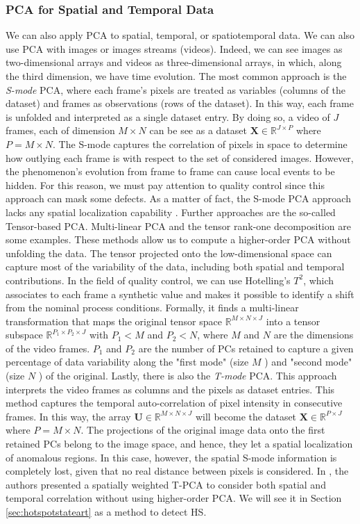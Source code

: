 \subsubsection{PCA for Spatial and Temporal Data}
We can also apply PCA to spatial, temporal, or spatiotemporal data. We can also use PCA with images or images streams (videos). Indeed, we can see images as two-dimensional arrays and videos as three-dimensional arrays, in which, along the third dimension, we have time evolution. The most common approach is the \emph{S-mode} PCA, where each frame's pixels are treated as variables (columns of the dataset) and frames as observations (rows of the dataset). In this way, each frame is unfolded and interpreted as a single dataset entry. By doing so, a video of $J$ frames, each of dimension $M\times N$ can be see as a dataset $\mathbf{X}\in\mathbb{R}^{J\times P}$ where $P=M\times N$. The S-mode captures the correlation of pixels in space to determine how outlying each frame is with respect to the set of considered images. However, the phenomenon's evolution from frame to frame can cause local events to be hidden. For this reason, we must pay attention to quality control since this approach can mask some defects. As a matter of fact, the S-mode PCA approach lacks any spatial localization capability \cite{colosimo_spatially_2018}. Further approaches are the so-called Tensor-based PCA. Multi-linear PCA and the tensor rank-one decomposition are some examples. These methods allow us to compute a higher-order PCA  without unfolding the data. The tensor projected onto the low-dimensional space can capture most of the variability of the data, including both spatial and temporal contributions. In the field of quality control, we can use Hotelling's $T^2$, which associates to each frame a synthetic value and makes it possible to identify a shift from the nominal process conditions. Formally, it finds a multi-linear transformation that maps the original tensor space $\mathbb{R}^{M \times N \times J}$ into a tensor subspace $\mathbb{R}^{P_1 \times P_2 \times J}$ with $P_1<M$ and $P_2<N$, where $M$ and $N$ are the dimensions of the video frames. $P_1$ and $P_2$ are the number of PCs retained to capture a given percentage of data variability along the "first mode" (size $M$ ) and "second mode" (size $N$ ) of the original. Lastly, there is also the \emph{T-mode} PCA. This approach interprets the video frames as columns and the pixels as dataset entries. This method captures the temporal auto-correlation of pixel intensity in consecutive frames. In this way, the array $\mathbf{U}\in \mathbb{R}^{M\times N \times J}$ will become the dataset $\mathbf{X}\in \mathbb{R}^{P\times J}$ where $P=M\times N$. The projections of the original image data onto the first retained PCs belong to the image space, and hence, they let a spatial localization of anomalous regions. In this case, however, the spatial S-mode information is completely lost, given that no real distance between pixels is considered. In \citeauthor{colosimo_spatially_2018}, the authors presented a spatially weighted T-PCA to consider both spatial and temporal correlation without using higher-order PCA. We will see it in Section \ref{sec:hotspotstateart} as a method to detect HS.
